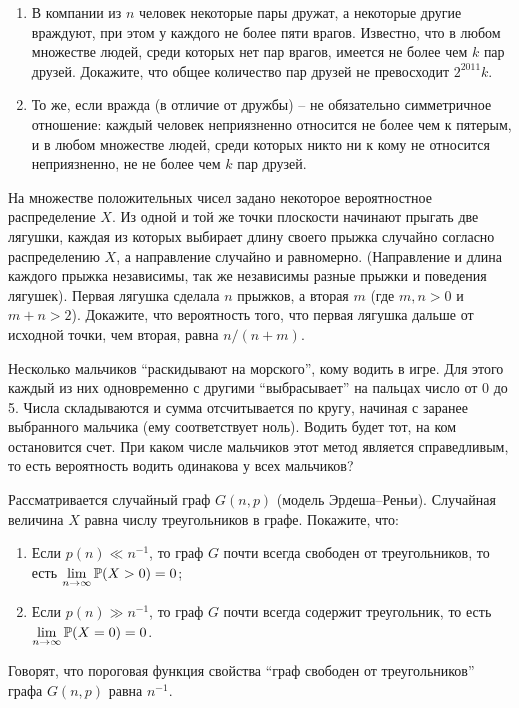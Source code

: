 \begin{problem}
\begin{enumerate}
\item В компании из $n$ человек некоторые пары
дружат, а некоторые другие враждуют, при этом у каждого не более
пяти врагов. Известно, что в любом множестве людей, среди которых нет пар врагов, имеется не более чем
$k$ пар друзей. Докажите, что общее количество пар друзей не превосходит $2^{2011}k$.
\item То же, если вражда (в отличие от дружбы) -- не обязательно симметричное отношение: каждый человек неприязненно относится не более чем к пятерым, и в любом множестве людей, среди которых никто ни к кому не относится неприязненно, не не более чем $k$ пар друзей.
\end{enumerate}
\end{problem}

\begin{problem}
На множестве положительных
чисел задано некоторое вероятностное распределение $X$.
Из одной и той же точки плоскости начинают прыгать две лягушки, каждая
из которых выбирает длину своего прыжка случайно
согласно распределению $X$, а направление случайно
и равномерно. (Направление и длина каждого прыжка независимы,
так же независимы разные прыжки и поведения лягушек).
Первая лягушка сделала $n$ прыжков, а вторая $m$
(где $m,n>0$ и $m+n>2$).
Докажите, что вероятность того, что первая лягушка дальше
от исходной точки, чем вторая, равна $n/(n+m)$.
\end{problem}


\begin{problem}
Несколько мальчиков ``раскидывают на морского'', кому водить в игре. Для этого каждый из них одновременно с другими
``выбрасывает'' на пальцах число от 0 до 5. Числа складываются и сумма отсчитывается по кругу, начиная с заранее
выбранного мальчика (ему соответствует
ноль). Водить будет тот, на ком остановится счет.
При каком числе мальчиков этот метод является справедливым, то есть
вероятность водить одинакова у всех мальчиков?
\end{problem}




\begin{problem}
\label{triangles}
Рассматривается случайный граф $G(n,p)$ (модель Эрдеша--Реньи). Случайная величина $X$ равна числу треугольников в графе. Покажите, что: 

\begin{enumerate}

\item Если $p(n) \ll  n^{-1} $, то граф $G$ почти всегда свободен от треугольников, то есть $\mathop{\lim }\limits_{n\to \infty } \mathrm{{\mathbb P}} (
X > 0)= 0$;

\item Если $p(n)\gg n^{-1} $, то граф $G$ почти всегда содержит треугольник, то есть $\mathop{\lim }\limits_{n\to \infty } \mathrm{{\mathbb P}} (X = 0)=0$.
\end{enumerate}

Говорят, что пороговая функция свойства ``граф  свободен от треугольников'' графа $G(n,p)$ равна $n^{-1} $.

\end{problem}


